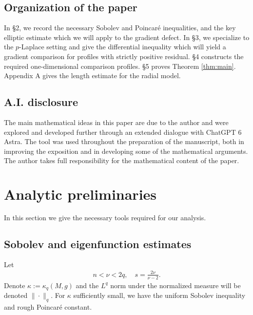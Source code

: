 \documentclass[11pt]{amsart}
\theoremstyle{definition}
\begin{document}
\subsection*{Organization of the paper}
In \S 2, we record the necessary Sobolev and Poincar\'e inequalities, and the key elliptic estimate which we will apply to the gradient defect. In \S 3, we specialize to the $p$-Laplace setting and give the differential inequality which will yield a gradient comparison for profiles with strictly positive residual. \S 4 constructs the required one-dimensional comparison profiles. \S 5 proves Theorem \ref{thm:main}. Appendix A gives the length estimate for the radial model.
\subsection*{A.I. disclosure}
 The main mathematical ideas in this paper are due to the author and
were explored and developed further through an extended dialogue with ChatGPT 6 Astra.
The tool was used throughout the preparation of the manuscript, both in improving the
exposition and in developing some of the mathematical arguments. The author takes full
responsibility for the mathematical content of the paper.

\section{Analytic preliminaries}
In this section we give the necessary tools required for our analysis.   

\subsection{Sobolev and eigenfunction estimates}
Let
\begin{align*}
    n<\nu<2q, \quad s=\frac{2\nu}{\nu-2}.
\end{align*}
Denote $\kappa:=\kappa_q(M,g)$ and the $L^q$ norm under the normalized measure will be denoted $\|\cdot\|_q$.  For $\kappa$ sufficiently small, we have the uniform Sobolev inequality and rough Poincar\'e constant.
\end{document}
